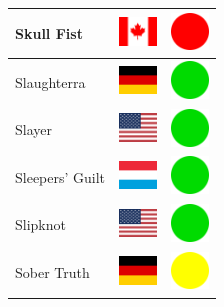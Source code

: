 \documentclass[12pt, a4paper, twoside]{report}
\begin{document}
\begin{center}
\begin{longtable}{|p{5cm}|p{2cm}|p{2cm}|}
			Skull Fist & \includegraphics[width=1cm]{4x3/ca} & \includegraphics[width=1cm]{likes/n} \\ \hline
			Slaughterra & \includegraphics[width=1cm]{4x3/de} & \includegraphics[width=1cm]{likes/y} \\ \hline
			Slayer & \includegraphics[width=1cm]{4x3/us} & \includegraphics[width=1cm]{likes/y} \\ \hline
			Sleepers' Guilt & \includegraphics[width=1cm]{4x3/lu} & \includegraphics[width=1cm]{likes/y} \\ \hline
			Slipknot & \includegraphics[width=1cm]{4x3/us} & \includegraphics[width=1cm]{likes/y} \\ \hline
			Sober Truth & \includegraphics[width=1cm]{4x3/de} & \includegraphics[width=1cm]{likes/m} \\ \hline

\end{longtable}
\end{center}
\end{document}
